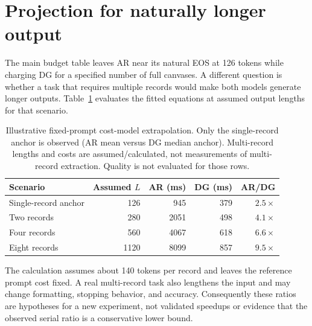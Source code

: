 \section{Projection for naturally longer output}
\label{app:forced}

The main budget table leaves AR near its natural EOS at 126 tokens
while charging DG for a specified number of full canvases. A different
question is whether a task that requires multiple records would make both
models generate longer outputs. Table~\ref{tab:forced} evaluates the
fitted equations at assumed output lengths for that scenario.

\begin{table}[ht]
\centering
\caption{Illustrative fixed-prompt cost-model extrapolation. Only the
single-record anchor is observed (AR mean versus DG median anchor).
Multi-record lengths and costs are assumed/calculated, not measurements
of multi-record extraction. Quality is not evaluated for those rows.}
\label{tab:forced}
\begin{tabular}{@{}lrrrr@{}}
\toprule
Scenario & Assumed $L$ & AR (ms) & DG (ms) & AR/DG \\
\midrule
Single-record anchor & 126 & 945 & 379 & $2.5\times$ \\
Two records & 280 & 2051 & 498 & $4.1\times$ \\
Four records & 560 & 4067 & 618 & $6.6\times$ \\
Eight records & 1120 & 8099 & 857 & $9.5\times$ \\
\bottomrule
\end{tabular}
\end{table}

The calculation assumes about 140 tokens per record and leaves the
reference prompt cost fixed. A real multi-record task also lengthens the
input and may change formatting, stopping behavior, and accuracy.
Consequently these ratios are hypotheses for a new experiment, not
validated speedups or evidence that the observed serial ratio is a
conservative lower bound.

